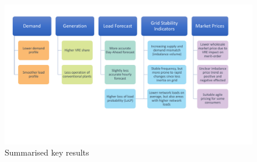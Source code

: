 \documentclass[energies,article,submit,moreauthors,pdftex]{Definitions/mdpi}
\begin{document}
\begin{figure}[H]
\centering
\hspace{-25pt}
\includegraphics[trim={1cm 4.5cm 0cm 1.5cm},clip,width=1.1\textwidth]{Graphics/Key-findingsV3.pdf}
\caption{Summarised key results}
\label{fig:key-results}
\end{figure} 
\end{document}
